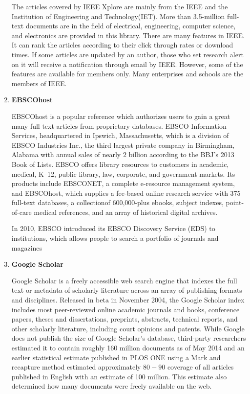 \begin{enumerate}
	The articles covered by IEEE Xplore are mainly from the IEEE and the Institution of Engineering and Technology(IET).
	More than 3.5-million full-text documents are in the field of electrical, engineering, computer science, and electronics are provided in this library. 
	There are many features in IEEE. It can rank the articles according to their click through rates or download times. 
    If some articles are updated by an author, those who set research alert on it will receive a notification through email by IEEE.
    However, some of the features are available for members only.
    Many enterprises and schools are the members of IEEE.
    
	
	\item\textbf{EBSCOhost}
	\setlength{\parindent}{1em}

	EBSCOhost is a popular reference which authorizes users to gain a great many full-text articles from proprietary databases.
	EBSCO Information Services, headquartered in Ipswich, Massachusetts, which is a division of EBSCO Industries Inc., the third largest private company in Birmingham, Alabama with annual sales of nearly $2$ billion according to the BBJ's 2013 Book of Lists.
    EBSCO offers library resources to customers in academic, medical, K–12, public library, law, corporate, and government markets. 
	Its products include EBSCONET, a complete e-resource management system, and EBSCOhost, which supplies a fee-based online research service with 375 full-text databases, a collectionof 600,000-plus ebooks, subject indexes, point-of-care medical references, and an array of historical digital archives.

    In 2010, EBSCO introduced its EBSCO Discovery Service (EDS) to institutions, which allows people to search a portfolio of journals and magazines

	\item\textbf{Google Scholar}
	\setlength{\parindent}{1em}
	
	Google Scholar is a freely accessible web search engine that indexes the full text or metadata of scholarly literature across an array of publishing formats and disciplines. Released in beta in November 2004, the Google Scholar index includes most peer-reviewed online academic journals and books, conference papers, theses and dissertations, preprints, abstracts, technical reports, and other scholarly literature, including court opinions and patents. While Google does not publish the size of Google Scholar's database, third-party researchers estimated it to contain roughly 160 million documents as of May 2014 and an earlier statistical estimate published in PLOS ONE using a Mark and recapture method estimated approximately $80-90$ coverage of all articles published in English with an estimate of 100 million. This estimate also determined how many documents were freely available on the web.
	

\end{enumerate}
